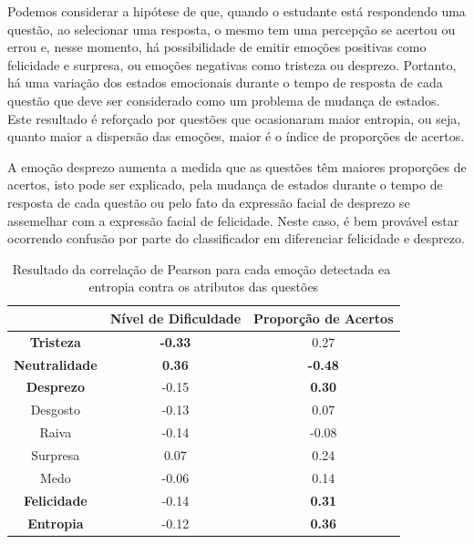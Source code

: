 Podemos considerar a hipótese de que, quando o estudante está respondendo uma questão, ao selecionar uma resposta, o mesmo tem uma percepção se acertou ou errou e, nesse momento, há possibilidade de emitir emoções positivas como felicidade e surpresa, ou emoções negativas como tristeza ou desprezo. Portanto, há uma variação dos estados emocionais durante o tempo de resposta de cada questão que deve ser considerado como um problema de mudança de estados. Este resultado é reforçado por
questões que ocasionaram maior entropia, ou seja, quanto maior a dispersão das emoções, maior é o índice de proporções de acertos.

A emoção desprezo aumenta a medida que as questões têm maiores proporções de acertos, isto pode ser explicado, pela mudança de estados durante o tempo de resposta de cada questão ou pelo fato da expressão facial de desprezo se assemelhar com a expressão facial de felicidade. Neste caso, é bem provável estar ocorrendo confusão por parte do classificador em diferenciar felicidade e desprezo.

\begin{table}[]\footnotesize
\centering
\caption{Resultado​ ​da​ ​correla\c{c}\~ao​ ​de​ ​Pearson​ ​para​ ​cada​ ​emo\c{c}\~ao​ ​detectada
e​ ​a​ ​entropia​ ​contra​ ​os​ ​atributos​ ​das​ ​quest\~oes}
\label{tabelaArti}
\begin{tabular}{|c|c|c|}
\hline
                      & \textbf{Nível de Dificuldade} & \textbf{Proporção de Acertos} \\ \hline
\textbf{Tristeza}     & \textbf{-0.33}                & 0.27                          \\ \hline
\textbf{Neutralidade} & \textbf{0.36}                 & \textbf{-0.48}                \\ \hline
\textbf{Desprezo}     & -0.15                         & \textbf{0.30}                 \\ \hline
Desgosto              & -0.13                         & 0.07                          \\ \hline
Raiva                 & -0.14                         & -0.08                         \\ \hline
Surpresa              & 0.07                          & 0.24                          \\ \hline
Medo                  & -0.06                         & 0.14                          \\ \hline
\textbf{Felicidade}   & -0.14                         & \textbf{0.31}                 \\ \hline
\textbf{Entropia}     & -0.12                         & \textbf{0.36}                 \\ \hline
\end{tabular}
\end{table}


